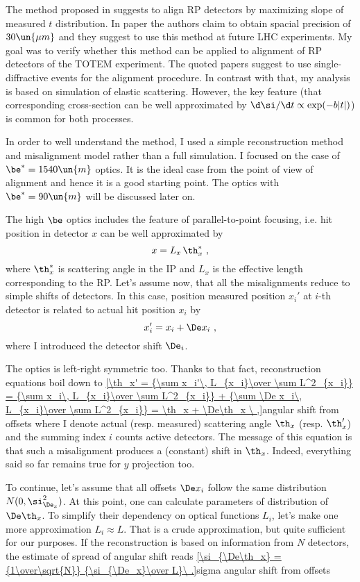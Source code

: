 The method proposed in  suggests to align RP detectors by maximizing slope of measured $t$ distribution. In paper  the authors claim to obtain spacial precision of $30\un{\mu m}$ and they suggest to use this method at future LHC experiments. My goal was to verify whether this method can be applied to alignment of RP detectors of the TOTEM experiment. The quoted papers suggest to use single-diffractive events for the alignment procedure. In contrast with that, my analysis is based on simulation of elastic scattering. However, the key feature (that corresponding cross-section can be well approximated by $\d\si/\d t \propto \exp(-b|t|)$) is common for both processes.

In order to well understand the method, I used a simple reconstruction method and misalignment model rather than a full simulation. I focused on the case of $\be^*=1540\un{m}$ optics. It is the ideal case from the point of view of alignment and hence it is a good starting point. The optics with $\be^*=90\un{m}$ will be discussed later on.

The high $\be$ optics includes the feature of parallel-to-point focusing, i.e. hit position in detector $x$ can be well approximated by
$$x = L_x\, \th_x^* \ ,$$
where $\th_x^*$ is scattering angle in the IP and $L_x$ is the effective length corresponding to the RP. Let's assume now, that all the misalignments reduce to simple shifts of detectors. In this case, position measured position $x_i'$ at $i$-th detector is related to actual hit position $x_i$ by
$$x_i' = x_i + \De x_i\ ,$$
where I introduced the detector shift $\De_i$.

The optics is left-right symmetric too. Thanks to that fact, reconstruction equations boil down to
\eqref{\th_x' = {\sum x_i'\, L_{x_i}\over \sum L^2_{x_i}} = {\sum x_i\, L_{x_i}\over \sum L^2_{x_i}} + {\sum \De x_i\, L_{x_i}\over \sum L^2_{x_i}} = \th_x + \De\th_x \ ,}{angular shift from offsets}
where I denote actual (resp. measured) scattering angle $\th_x$ (resp. $\th'_x$) and the summing index $i$ counts active detectors. The message of this equation is that such a misalignment produces a (constant) shift in $\th_x$. Indeed, everything said so far remains true for $y$ projection too.

To continue, let's assume that all offsets $\De x_i$ follow the same distribution $N(0, \si_{\De_x}^2)$. At this point, one can calculate parameters of distribution of $\De\th_x$. To simplify their dependency on optical functions $L_i$, let's make one more approximation $L_i\approx L$. That is a crude approximation, but quite sufficient for our purposes. If the reconstruction is based on information from $N$ detectors, the estimate of spread of angular shift reads
\eqref{\si_{\De\th_x} = {1\over\sqrt{N}} {\si_{\De_x}\over L}\ .}{sigma angular shift from offsets}

